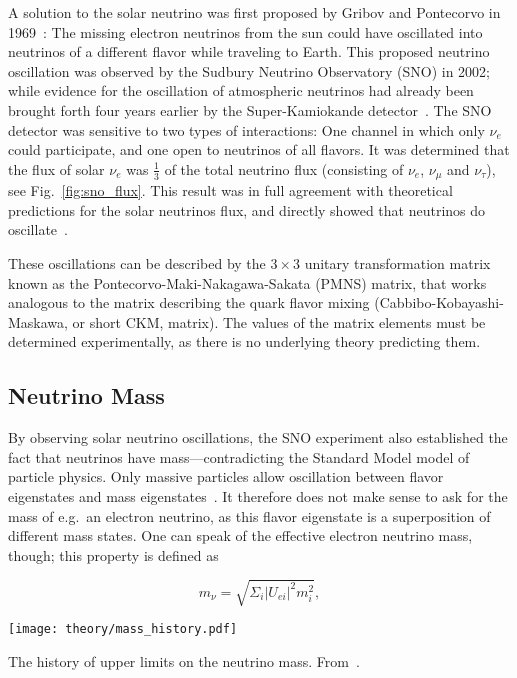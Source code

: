 A solution to the solar neutrino was first proposed by Gribov and Pontecorvo in 1969~: The missing electron neutrinos from the sun could have oscillated into neutrinos of a different flavor while traveling to Earth. This proposed neutrino oscillation was observed by the Sudbury Neutrino Observatory (SNO) in 2002; while evidence for the oscillation of atmospheric neutrinos had already been brought forth four years earlier by the Super-Kamiokande detector~. The SNO detector was sensitive to two types of interactions: One channel in which only $\nu_e$ could participate, and one open to neutrinos of all flavors. It was determined that the flux of solar $\nu_e$ was $\frac{1}{3}$ of the total neutrino flux (consisting of $\nu_e$, $\nu_\mu$ and $\nu_\tau$), see Fig.~\ref{fig:sno_flux}. This result was in full agreement with theoretical predictions for the solar neutrinos flux, and directly showed that neutrinos do oscillate~.

These oscillations can be described by the $3\times3$ unitary transformation matrix known as the Pontecorvo-Maki-Nakagawa-Sakata (PMNS) matrix, that works analogous to the matrix describing the quark flavor mixing (Cabbibo-Kobayashi-Maskawa, or short CKM, matrix). The values of the matrix elements must be determined experimentally, as there is no underlying theory predicting them.

\subsection{Neutrino Mass}
By observing solar neutrino oscillations, the SNO experiment also established the fact that neutrinos have mass---contradicting the Standard Model model of particle physics. Only massive particles allow oscillation between flavor eigenstates and mass eigenstates~. It therefore does not make sense to ask for the mass of e.g.\ an electron neutrino, as this flavor eigenstate is a superposition of different mass states. One can speak of the effective electron neutrino mass, though; this property is defined as

\begin{equation}\label{pmns}
    m_\nu = \sqrt{ \Sigma_i |U_{ei}|^2 m_i^2 },
\end{equation}

\begin{marginfigure}
    \texttt{[image: theory/mass\_history.pdf]}
    \caption[Neutrino mass upper limit history]{The history of upper limits on the neutrino mass. From~\cite{Aker2022}.}
\end{marginfigure}

